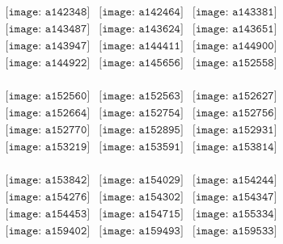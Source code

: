 \documentclass{article}
\begin{document}
\begin{figure}[H]
 \begin{center}$
 \begin{array}{cccc}
\texttt{[image: a142348]}&\texttt{[image: a142464]}&\texttt{[image: a143381]}\\\texttt{[image: a143487]}&\texttt{[image: a143624]}&\texttt{[image: a143651]}\\\texttt{[image: a143947]}&\texttt{[image: a144411]}&\texttt{[image: a144900]}\\\texttt{[image: a144922]}&\texttt{[image: a145656]}&\texttt{[image: a152558]}\\
\end{array}$
\end{center}
\end{figure}

\begin{figure}[H]
 \begin{center}$
 \begin{array}{cccc}
\texttt{[image: a152560]}&\texttt{[image: a152563]}&\texttt{[image: a152627]}\\\texttt{[image: a152664]}&\texttt{[image: a152754]}&\texttt{[image: a152756]}\\\texttt{[image: a152770]}&\texttt{[image: a152895]}&\texttt{[image: a152931]}\\\texttt{[image: a153219]}&\texttt{[image: a153591]}&\texttt{[image: a153814]}\\
\end{array}$
\end{center}
\end{figure}

\begin{figure}[H]
 \begin{center}$
 \begin{array}{cccc}
\texttt{[image: a153842]}&\texttt{[image: a154029]}&\texttt{[image: a154244]}\\\texttt{[image: a154276]}&\texttt{[image: a154302]}&\texttt{[image: a154347]}\\\texttt{[image: a154453]}&\texttt{[image: a154715]}&\texttt{[image: a155334]}\\\texttt{[image: a159402]}&\texttt{[image: a159493]}&\texttt{[image: a159533]}\\
\end{array}$
\end{center}
\end{figure}
\end{document}
